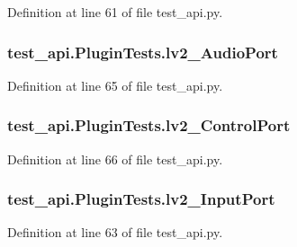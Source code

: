 Definition at line 61 of file test\+\_\+api.\+py.

\subsubsection[{\texorpdfstring{lv2\+\_\+\+Audio\+Port}{lv2_AudioPort}}]{\setlength{\rightskip}{0pt plus 5cm}test\+\_\+api.\+Plugin\+Tests.\+lv2\+\_\+\+Audio\+Port}\hypertarget{classtest__api_1_1_plugin_tests_afacb9180bfaaa3c56c42b0163048bfd9}{}\label{classtest__api_1_1_plugin_tests_afacb9180bfaaa3c56c42b0163048bfd9}


Definition at line 65 of file test\+\_\+api.\+py.

\subsubsection[{\texorpdfstring{lv2\+\_\+\+Control\+Port}{lv2_ControlPort}}]{\setlength{\rightskip}{0pt plus 5cm}test\+\_\+api.\+Plugin\+Tests.\+lv2\+\_\+\+Control\+Port}\hypertarget{classtest__api_1_1_plugin_tests_a4350d76bca54c9120ded035a31a1e347}{}\label{classtest__api_1_1_plugin_tests_a4350d76bca54c9120ded035a31a1e347}


Definition at line 66 of file test\+\_\+api.\+py.

\subsubsection[{\texorpdfstring{lv2\+\_\+\+Input\+Port}{lv2_InputPort}}]{\setlength{\rightskip}{0pt plus 5cm}test\+\_\+api.\+Plugin\+Tests.\+lv2\+\_\+\+Input\+Port}\hypertarget{classtest__api_1_1_plugin_tests_a58a09226b61be36f97025ea860196ea4}{}\label{classtest__api_1_1_plugin_tests_a58a09226b61be36f97025ea860196ea4}


Definition at line 63 of file test\+\_\+api.\+py.

